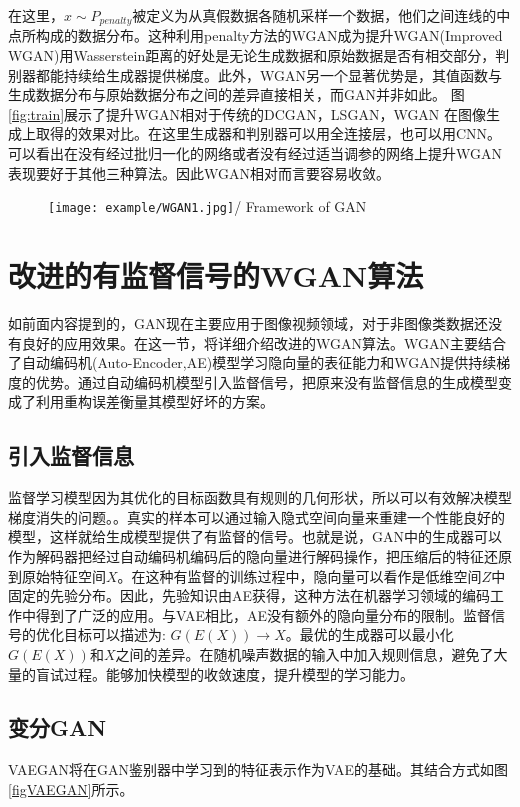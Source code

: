 在这里，$\hat{x}\sim P_{ {penalty}}$被定义为从真假数据各随机采样一个数据，他们之间连线的中点所构成的数据分布。这种利用penalty方法的WGAN成为提升WGAN(Improved WGAN)用Wasserstein距离的好处是无论生成数据和原始数据是否有相交部分，判别器都能持续给生成器提供梯度。此外，WGAN另一个显著优势是，其值函数与生成数据分布与原始数据分布之间的差异直接相关，而GAN并非如此。
图\ref{fig:train}展示了提升WGAN相对于传统的DCGAN，LSGAN，WGAN 在图像生成上取得的效果对比。在这里生成器和判别器可以用全连接层，也可以用CNN。可以看出在没有经过批归一化的网络或者没有经过适当调参的网络上提升WGAN表现要好于其他三种算法。因此WGAN相对而言要容易收敛。
\begin{figure}[!htp]
	\centering
	\texttt{[image: example/WGAN1.jpg]}/
	\hspace{1cm}
	{Framework of GAN}
	\label{fig:GAN1}
\end{figure}

\section{改进的有监督信号的WGAN算法}
如前面内容提到的，GAN现在主要应用于图像视频领域，对于非图像类数据还没有良好的应用效果。在这一节，将详细介绍改进的WGAN算法。WGAN主要结合了自动编码机(Auto-Encoder,AE)模型学习隐向量的表征能力和WGAN提供持续梯度的优势。通过自动编码机模型引入监督信号，把原来没有监督信息的生成模型变成了利用重构误差衡量其模型好坏的方案。
\subsection{引入监督信息}
监督学习模型因为其优化的目标函数具有规则的几何形状，所以可以有效解决模型梯度消失的问题。\cite{11}。真实的样本可以通过输入隐式空间向量来重建一个性能良好的模型，这样就给生成模型提供了有监督的信号。也就是说，GAN中的生成器可以作为解码器把经过自动编码机编码后的隐向量进行解码操作，把压缩后的特征还原到原始特征空间$X$。在这种有监督的训练过程中，隐向量可以看作是低维空间$Z$中固定的先验分布。因此，先验知识由AE获得，这种方法在机器学习领域的编码工作中得到了广泛的应用。与VAE相比，AE没有额外的隐向量分布的限制。监督信号的优化目标可以描述为:  $ G(E(X))\rightarrow X $。最优的生成器可以最小化$ G(E(X))$和$X$之间的差异。在随机噪声数据的输入中加入规则信息，避免了大量的盲试过程。能够加快模型的收敛速度，提升模型的学习能力。
\subsection{变分GAN}
VAEGAN将在GAN鉴别器中学习到的特征表示作为VAE的基础。其结合方式如图\ref{figVAEGAN}所示。

